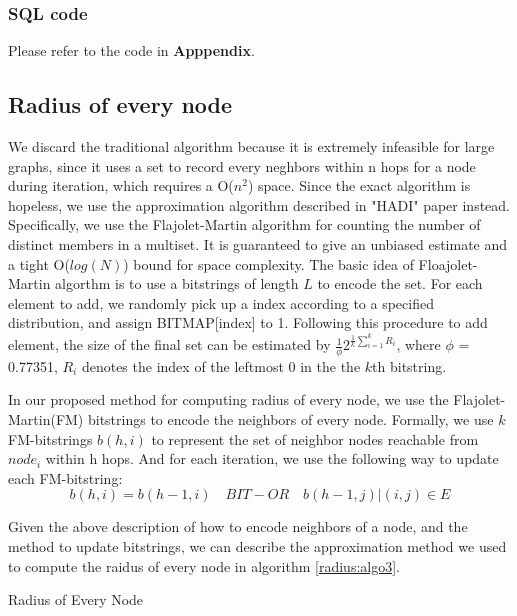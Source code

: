 \subsubsection{SQL code}
Please refer to the code in {\bf Apppendix}.

\subsection{Radius of every node}
We discard the traditional algorithm because it is extremely infeasible for large graphs, since it uses a set to record every neghbors within n hops for a node during iteration, which requires a O($n^2$) space.
Since the exact algorithm is hopeless, we use the approximation algorithm described in "HADI" paper\cite{DBLP:journals/tkdd/KangTAFL11} instead. Specifically, we use the Flajolet-Martin algorithm for counting the number of distinct members in a multiset. It is guaranteed to give an unbiased estimate and a tight O($log(N)$) bound for space complexity. The basic idea of Floajolet-Martin algorthm is to use a bitstrings of length $L$ to encode the set. For each element to add, we randomly pick up a index according to a specified distribution, and assign BITMAP[index] to 1. Following this procedure to add element, the size of the final set can be estimated by $\frac{1}{\phi} 2^{\frac{1}{k}\sum_{i=1}^k R_i}$, where $\phi$ = 0.77351, $R_i$ denotes the index of the leftmost 0 in the the $k$th bitstring.

In our proposed method for computing radius of every node, we use the Flajolet-Martin(FM) bitstrings to encode the neighbors of every node. Formally, we use $k$ FM-bitstrings $b(h, i)$ to represent the set of neighbor nodes reachable from $node_i$ within h hops. And for each iteration, we use the following way to update each FM-bitstring:$$b(h,i) = b(h-1,i)  \quad BIT-OR \quad  {b(h-1,j)|(i,j)\in E}$$

Given the above description of how to encode neighbors of a node, and the method to update bitstrings, we can describe the approximation method we used to compute the raidus of every node in algorithm \ref{radius:algo3}.

\begin{algorithm}
\caption{Radius of Every Node}
\begin{algorithmic}
\REPEAT
{}
\end{algorithmic}
\label{radius:algo3}
\end{algorithm}

